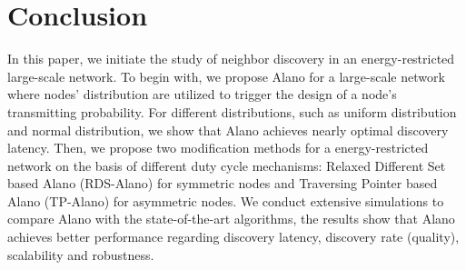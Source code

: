 \section{Conclusion}
\label{Conclusion}
In this paper, we initiate the study of neighbor discovery in an energy-restricted large-scale network.
To begin with, we propose Alano for a large-scale network where nodes' distribution are utilized to trigger the design of a node's transmitting probability. For different distributions, such as uniform distribution and normal distribution, we show that Alano achieves nearly optimal discovery latency. Then, we propose two modification methods for a energy-restricted network on the basis of different duty cycle mechanisms: Relaxed Different Set based Alano (RDS-Alano) for symmetric nodes and Traversing Pointer based Alano (TP-Alano) for asymmetric nodes. We conduct extensive simulations to compare Alano with the state-of-the-art algorithms, the results show that Alano achieves better performance regarding discovery latency, discovery rate (quality), scalability and robustness.  
